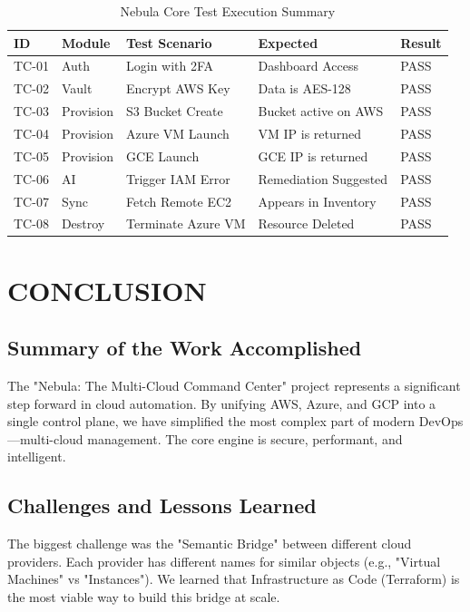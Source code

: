 \begin{table}[H]
\centering
\begin{tabular}{|l|l|l|l|l|}
\hline
\textbf{ID} & \textbf{Module} & \textbf{Test Scenario} & \textbf{Expected} & \textbf{Result} \\ \hline
TC-01 & Auth & Login with 2FA & Dashboard Access & PASS \\ \hline
TC-02 & Vault & Encrypt AWS Key & Data is AES-128 & PASS \\ \hline
TC-03 & Provision & S3 Bucket Create & Bucket active on AWS & PASS \\ \hline
TC-04 & Provision & Azure VM Launch & VM IP is returned & PASS \\ \hline
TC-05 & Provision & GCE Launch & GCE IP is returned & PASS \\ \hline
TC-06 & AI & Trigger IAM Error & Remediation Suggested & PASS \\ \hline
TC-07 & Sync & Fetch Remote EC2 & Appears in Inventory & PASS \\ \hline
TC-08 & Destroy & Terminate Azure VM & Resource Deleted & PASS \\ \hline
\end{tabular}
\caption{Nebula Core Test Execution Summary}
\end{table}

\newpage
\chapter{CONCLUSION}

\section{Summary of the Work Accomplished}
The "Nebula: The Multi-Cloud Command Center" project represents a significant step forward in cloud automation. By unifying AWS, Azure, and GCP into a single control plane, we have simplified the most complex part of modern DevOps—multi-cloud management. The core engine is secure, performant, and intelligent.

\section{Challenges and Lessons Learned}
The biggest challenge was the "Semantic Bridge" between different cloud providers. Each provider has different names for similar objects (e.g., "Virtual Machines" vs "Instances"). We learned that Infrastructure as Code (Terraform) is the most viable way to build this bridge at scale.

